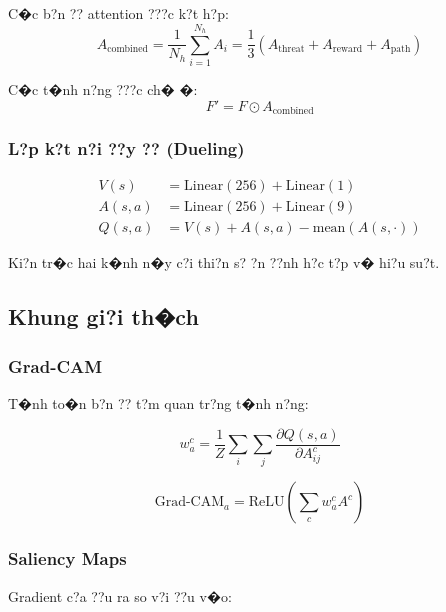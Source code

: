 \documentclass[11pt,a4paper]{article}
\begin{document}
C�c b?n ?? attention ???c k?t h?p:
\begin{equation}
A_{\text{combined}} = \frac{1}{N_h}\sum_{i=1}^{N_h} A_i = \frac{1}{3}(A_{\text{threat}} + A_{\text{reward}} + A_{\text{path}})
\end{equation}

C�c t�nh n?ng ???c ch� �:
\begin{equation}
F' = F \odot A_{\text{combined}}
\end{equation}

\subsubsection{L?p k?t n?i ??y ?? (Dueling)}

\begin{equation}
\begin{split}
V(s) &= \text{Linear}(256) + \text{Linear}(1) \\
A(s,a) &= \text{Linear}(256) + \text{Linear}(9) \\
Q(s,a) &= V(s) + A(s,a) - \text{mean}(A(s,\cdot))
\end{split}
\end{equation}

Ki?n tr�c hai k�nh n�y c?i thi?n s? ?n ??nh h?c t?p v� hi?u su?t.

\subsection{Khung gi?i th�ch}

\subsubsection{Grad-CAM}

T�nh to�n b?n ?? t?m quan tr?ng t�nh n?ng:

\begin{equation}
w_a^c = \frac{1}{Z}\sum_i \sum_j \frac{\partial Q(s,a)}{\partial A_{ij}^c}
\end{equation}

\begin{equation}
\text{Grad-CAM}_a = \text{ReLU}\left(\sum_c w_a^c A^c\right)
\end{equation}

\subsubsection{Saliency Maps}

Gradient c?a ??u ra so v?i ??u v�o:
\end{document}
